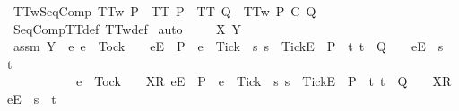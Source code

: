 \begin{isabellebody}
{\isafoldproof}%
%
\isadelimproof
\isanewline
%
\endisadelimproof
\isanewline
\isanewline
{}\isamarkupfalse%
\ TT{}w{\isacharunderscore}SeqComp{\isacharcolon}\ {\isachardoublequoteopen}TT{}w\ P\ {\isasymLongrightarrow}\ TT\ P\ {\isasymLongrightarrow}\ TT\ Q\ {\isasymLongrightarrow}\ TT{}w\ {\isacharparenleft}P\ {\isacharsemicolon}\isactrlsub C\ Q{\isacharparenright}{\isachardoublequoteclose}\isanewline
%
\isadelimproof
\ \ %
\endisadelimproof
%
\isatagproof
{}\isamarkupfalse%
\ SeqCompTT{\isacharunderscore}def\ TT{}w{\isacharunderscore}def\isanewline
{}\isamarkupfalse%
\ auto\isanewline
\ \ \isamarkupfalse%
\ {\isasymrho}\ X\ Y\isanewline
\ \ \isamarkupfalse%
\ assm{}{\isacharcolon}\ {\isachardoublequoteopen}Y\ {\isasyminter}\ {\isacharbraceleft}e{\isachardot}\ e\ {\isasymnoteq}\ Tock\ {\isasymand}\ {\isacharparenleft}{\isasymrho}\ {\isacharat}\ {\isacharbrackleft}{\isacharbrackleft}e{\isacharbrackright}\isactrlsub E{\isacharbrackright}\ {\isasymin}\ P\ {\isasymand}\ e\ {\isasymnoteq}\ Tick\ {\isasymor}\ {\isacharparenleft}{\isasymexists}s{\isachardot}\ s\ {\isacharat}\ {\isacharbrackleft}{\isacharbrackleft}Tick{\isacharbrackright}\isactrlsub E{\isacharbrackright}\ {\isasymin}\ P\ {\isasymand}\ {\isacharparenleft}{\isasymexists}t{\isachardot}\ t\ {\isasymin}\ Q\ {\isasymand}\ {\isasymrho}\ {\isacharat}\ {\isacharbrackleft}{\isacharbrackleft}e{\isacharbrackright}\isactrlsub E{\isacharbrackright}\ {\isacharequal}\ s\ {\isacharat}\ t{\isacharparenright}{\isacharparenright}{\isacharparenright}\ {\isasymor}\isanewline
\ \ \ \ \ \ \ \ \ \ \ e\ {\isacharequal}\ Tock\ {\isasymand}\ {\isacharparenleft}{\isasymrho}\ {\isacharat}\ {\isacharbrackleft}{\isacharbrackleft}X{\isacharbrackright}\isactrlsub R{\isacharcomma}\ {\isacharbrackleft}e{\isacharbrackright}\isactrlsub E{\isacharbrackright}\ {\isasymin}\ P\ {\isasymand}\ e\ {\isasymnoteq}\ Tick\ {\isasymor}\ {\isacharparenleft}{\isasymexists}s{\isachardot}\ s\ {\isacharat}\ {\isacharbrackleft}{\isacharbrackleft}Tick{\isacharbrackright}\isactrlsub E{\isacharbrackright}\ {\isasymin}\ P\ {\isasymand}\ {\isacharparenleft}{\isasymexists}t{\isachardot}\ t\ {\isasymin}\ Q\ {\isasymand}\ {\isasymrho}\ {\isacharat}\ {\isacharbrackleft}{\isacharbrackleft}X{\isacharbrackright}\isactrlsub R{\isacharcomma}\ {\isacharbrackleft}e{\isacharbrackright}\isactrlsub E{\isacharbrackright}\ {\isacharequal}\ s\ {\isacharat}\ t{\isacharparenright}{\isacharparenright}{\isacharparenright}{\isacharbraceright}\ {\isacharequal}\ {\isacharbraceleft}{\isacharbraceright}{\isachardoublequoteclose}\isanewline

\end{isabellebody}
